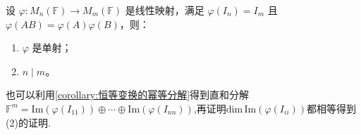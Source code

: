 \documentclass[../../main.tex]{subfiles}%
\begin{document}
\begin{proposition}
设 $\varphi:M_n(\mathbb F)\to M_m(\mathbb F)$ 是线性映射，满足 $\varphi(I_n)=I_m$ 且 $\varphi(AB)=\varphi(A)\varphi(B)$，则：
\begin{enumerate}[(1)]
\item $\varphi$ 是单射；
\item $n\mid m$。
\end{enumerate}
\end{proposition}
\begin{remark}
也可以利用\cref{corollary:恒等变换的幂等分解}得到直和分解$\mathbb{F} ^m=\mathrm{Im}\left( \varphi \left( I_{11} \right) \right) \oplus \cdots \oplus \mathrm{Im}\left( \varphi \left( I_{nn} \right) \right) $,再证明$\mathrm{dim}\,\mathrm{Im}\left( \varphi \left( I_{ii} \right) \right) $都相等得到(2)的证明.
\end{remark}
\end{document}
